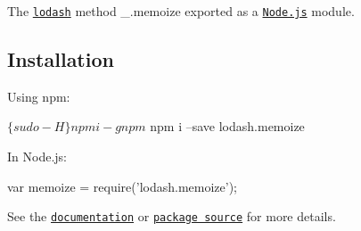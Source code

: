 The \href{https://lodash.com/}{\tt lodash} method {\ttfamily \+\_\+.\+memoize} exported as a \href{https://nodejs.org/}{\tt Node.\+js} module.

\subsection*{Installation}

Using npm\+: 
\begin{DoxyCode}
$ \{sudo -H\} npm i -g npm
$ npm i --save lodash.memoize
\end{DoxyCode}


In Node.\+js\+: 
\begin{DoxyCode}
var memoize = require('lodash.memoize');
\end{DoxyCode}


See the \href{https://lodash.com/docs#memoize}{\tt documentation} or \href{https://github.com/lodash/lodash/blob/4.1.2-npm-packages/lodash.memoize}{\tt package source} for more details. 